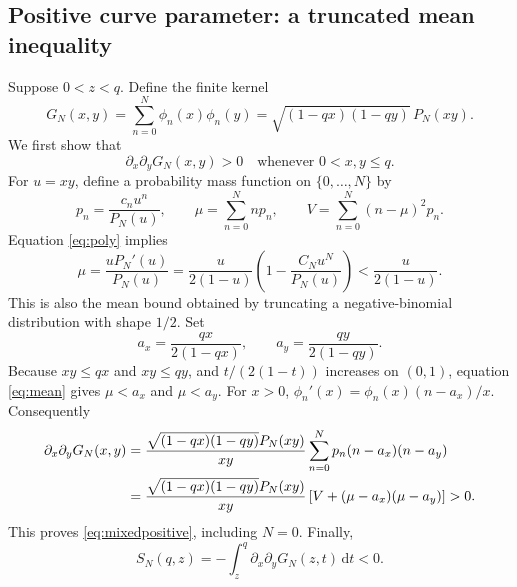 \documentclass[11pt]{article}
\theoremstyle{remark}
\newcommand{\dd}{\,\mathrm d}
\begin{document}
\subsection{Positive curve parameter: a truncated mean inequality}
Suppose $0<z<q$.
Define the finite kernel
\[
 G_N(x,y)=\sum_{n=0}^N\phi_n(x)\phi_n(y)
 =\sqrt{(1-qx)(1-qy)}\,P_N(xy).
\]
We first show that
\begin{equation}\label{eq:mixedpositive}
 \partial_x\partial_y G_N(x,y)>0
 \quad\text{whenever }0<x,y\le q.
\end{equation}
For $u=xy$, define a probability mass function on $\{0,\ldots,N\}$ by
\[
 p_n=\frac{c_nu^n}{P_N(u)},\qquad
 \mu=\sum_{n=0}^N n p_n,\qquad
 V=\sum_{n=0}^N(n-\mu)^2p_n.
\]
Equation \eqref{eq:poly} implies
\begin{equation}\label{eq:mean}
 \mu=\frac{uP_N'(u)}{P_N(u)}
 =\frac{u}{2(1-u)}\left(1-\frac{C_Nu^N}{P_N(u)}\right)
 <\frac{u}{2(1-u)}.
\end{equation}
This is also the mean bound obtained by truncating a negative-binomial distribution with shape $1/2$.
Set
\[
 a_x=\frac{qx}{2(1-qx)},\qquad a_y=\frac{qy}{2(1-qy)}.
\]
Because $xy\le qx$ and $xy\le qy$, and $t/(2(1-t))$ increases on $(0,1)$, equation \eqref{eq:mean} gives $\mu<a_x$ and $\mu<a_y$.
For $x>0$,
$\phi_n'(x)=\phi_n(x)(n-a_x)/x$.
Consequently
\begin{align}
 \partial_x\partial_yG_N(x,y)
 &=\frac{\sqrt{(1-qx)(1-qy)}P_N(xy)}{xy}
 \sum_{n=0}^N p_n(n-a_x)(n-a_y)\notag\\
 &=\frac{\sqrt{(1-qx)(1-qy)}P_N(xy)}{xy}
 \left[V+(\mu-a_x)(\mu-a_y)\right]>0.\label{eq:covariance}
\end{align}
This proves \eqref{eq:mixedpositive}, including $N=0$.
Finally,
\begin{equation}\label{eq:positiveprefix}
 S_N(q,z)=-\int_z^q\partial_x\partial_yG_N(z,t)\dd t<0.
\end{equation}
\end{document}
